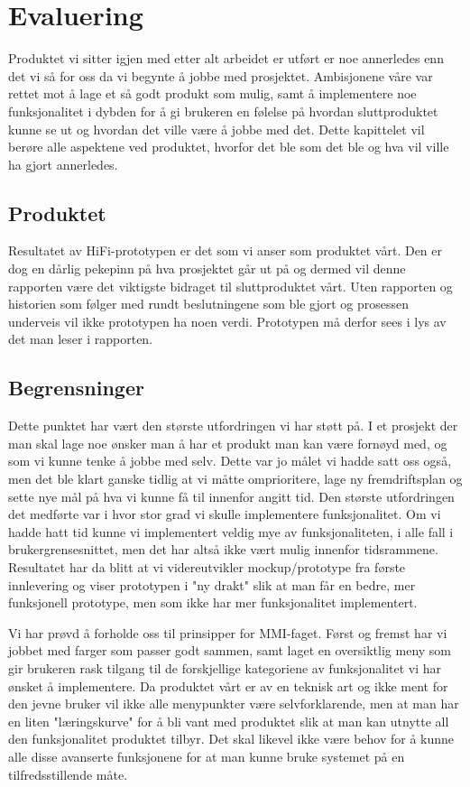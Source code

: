 \chapter{Evaluering}
\lettrine[lines=2]{P}{}roduktet vi sitter igjen med etter alt arbeidet er utført er noe annerledes enn det vi så for oss da vi begynte å jobbe med prosjektet. Ambisjonene våre var rettet mot å lage et så godt produkt som mulig, samt å implementere noe funksjonalitet i dybden for å gi brukeren en følelse på hvordan sluttproduktet kunne se ut og hvordan det ville være å jobbe med det. Dette kapittelet vil berøre alle aspektene ved produktet, hvorfor det ble som det ble og hva vil ville ha gjort annerledes.

\section{Produktet}
Resultatet av HiFi-prototypen er det som vi anser som produktet vårt. Den er dog en dårlig pekepinn på hva prosjektet går ut på og dermed vil denne rapporten være det viktigste bidraget til sluttproduktet vårt. Uten rapporten og historien som følger med rundt beslutningene som ble gjort og prosessen underveis vil ikke prototypen ha noen verdi. Prototypen må derfor sees i lys av det man leser i rapporten.


\section{Begrensninger} \label{sec:begrensninger}
Dette punktet har vært den største utfordringen vi har støtt på. I et prosjekt der man skal lage noe ønsker man å har et produkt man kan være fornøyd med, og som vi kunne tenke å jobbe med selv. Dette var jo målet vi hadde satt oss også, men det ble klart ganske tidlig at vi måtte omprioritere, lage ny fremdriftsplan og sette nye mål på hva vi kunne få til innenfor angitt tid.
Den største utfordringen det medførte var i hvor stor grad vi skulle implementere funksjonalitet. Om vi hadde hatt tid kunne vi implementert veldig mye av funksjonaliteten, i alle fall i brukergrensesnittet, men det har altså ikke vært mulig innenfor tidsrammene.
Resultatet har da blitt at vi videreutvikler mockup/prototype fra første innlevering og viser prototypen i "ny drakt" slik at man får en bedre, mer funksjonell prototype, men som ikke har mer funksjonalitet implementert.

Vi har prøvd å forholde oss til prinsipper for MMI-faget. Først og fremst har vi jobbet med farger som passer godt sammen, samt laget en oversiktlig meny som gir brukeren rask tilgang til de forskjellige kategoriene av funksjonalitet vi har ønsket å implementere.
Da produktet vårt er av en teknisk art og ikke ment for den jevne bruker vil ikke alle menypunkter være selvforklarende, men at man har en liten "læringskurve" for å bli vant med produktet slik at man kan utnytte all den funksjonalitet produktet tilbyr.
Det skal likevel ikke være behov for å kunne alle disse avanserte funksjonene for at man kunne bruke systemet på en tilfredsstillende måte.


